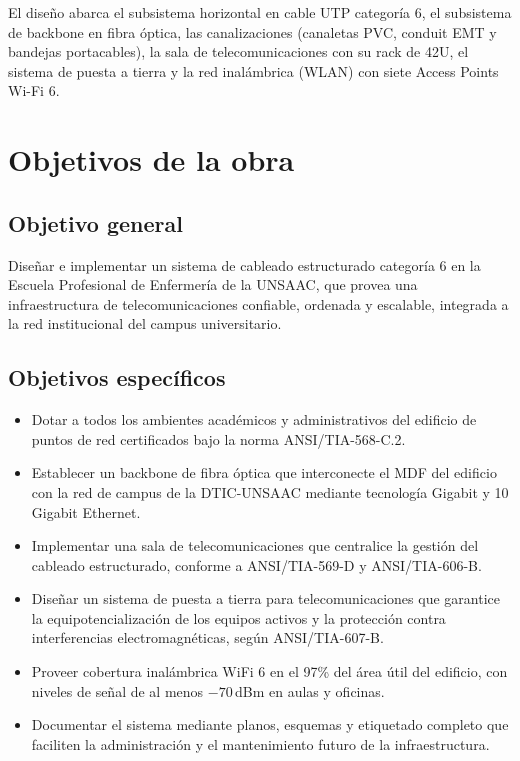 El diseño abarca el subsistema horizontal en cable UTP categoría 6, el subsistema
de backbone en fibra óptica, las canalizaciones (canaletas PVC, conduit EMT y
bandejas portacables), la sala de telecomunicaciones con su rack de 42U, el sistema
de puesta a tierra y la red inalámbrica (WLAN) con siete Access Points Wi-Fi 6.

\section{Objetivos de la obra}
\label{sec:objetivos}

\subsection{Objetivo general}

Diseñar e implementar un sistema de cableado estructurado categoría 6 en la
Escuela Profesional de Enfermería de la UNSAAC, que provea una infraestructura
de telecomunicaciones confiable, ordenada y escalable, integrada a la red
institucional del campus universitario.

\subsection{Objetivos específicos}

\begin{itemize}
    \item Dotar a todos los ambientes académicos y administrativos del edificio
    de puntos de red certificados bajo la norma \mbox{ANSI/TIA-568-C.2}.

    \item Establecer un backbone de fibra óptica que interconecte el MDF del
    edificio con la red de campus de la DTIC-UNSAAC mediante tecnología Gigabit
    y 10 Gigabit Ethernet.

    \item Implementar una sala de telecomunicaciones que centralice
    la gestión del cableado estructurado, conforme a \mbox{ANSI/TIA-569-D} y
    \mbox{ANSI/TIA-606-B}.

    \item Diseñar un sistema de puesta a tierra para telecomunicaciones que
    garantice la equipotencialización de los equipos activos y la protección
    contra interferencias electromagnéticas, según \mbox{ANSI/TIA-607-B}.

    \item Proveer cobertura inalámbrica WiFi 6 en el 97\% del área útil del
    edificio, con niveles de señal de al menos $-70$\,dBm en aulas y oficinas.

    \item Documentar el sistema mediante planos, esquemas y etiquetado completo
    que faciliten la administración y el mantenimiento futuro de la infraestructura.
\end{itemize}

